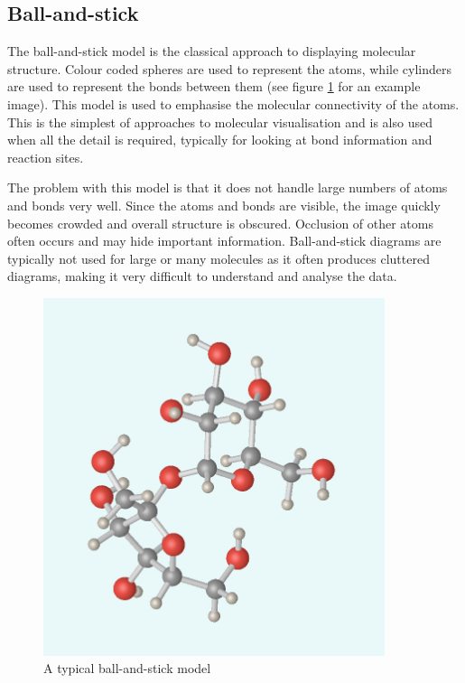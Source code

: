 
\subsection{Ball-and-stick}
\label{sub:background_ballstick}

The ball-and-stick model is the classical approach to displaying molecular
structure. Colour coded spheres are used to represent the atoms, while
cylinders are used to represent the bonds between them (see figure
\ref{fig:background_ballstick} for an example image). This model is used to
emphasise the molecular connectivity of the atoms. This is the simplest of
approaches to molecular visualisation and is also used when all the detail is
required, typically for looking at bond information and reaction sites.

The problem with this model is that it does not handle large numbers of atoms
and bonds very well. Since the atoms and bonds are visible, the image quickly
becomes crowded and overall structure is obscured. Occlusion of other atoms
often occurs and may hide important information. Ball-and-stick diagrams are
typically not used for large or many molecules as it often produces cluttered
diagrams, making it very difficult to understand and analyse the data.

\begin{figure}[h!]
  \begin{center}
    \includegraphics[width=100mm]{BallStick}
  \end{center}
  \caption{A typical ball-and-stick model}
  \label{fig:background_ballstick}
\end{figure}


